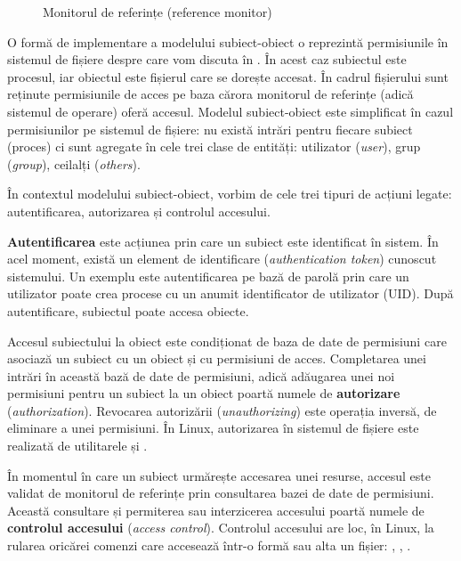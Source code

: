 \begin{figure}[htbp]
  \centering
  \def\svgwidth{\columnwidth}
  
  \caption{Monitorul de referințe (reference monitor)}
  \label{fig:sec:reference-monitor}
\end{figure}

O formă de implementare a modelului subiect-obiect o reprezintă permisiunile în sistemul de fișiere despre care vom discuta în . În acest caz subiectul este procesul, iar obiectul este fișierul care se dorește accesat. În cadrul fișierului sunt reținute permisiunile de acces pe baza cărora monitorul de referințe (adică sistemul de operare) oferă accesul. Modelul subiect-obiect este simplificat în cazul permisiunilor pe sistemul de fișiere: nu există intrări pentru fiecare subiect (proces) ci sunt agregate în cele trei clase de entități: utilizator (\textit{user}), grup (\textit{group}), ceilalți (\textit{others}).

În contextul modelului subiect-obiect, vorbim de cele trei tipuri de acțiuni legate: autentificarea, autorizarea și controlul accesului.

\textbf{Autentificarea} este acțiunea prin care un subiect este identificat în sistem. În acel moment, există un element de identificare (\textit{authentication token}) cunoscut sistemului. Un exemplu este autentificarea pe bază de parolă prin care un utilizator poate crea procese cu un anumit identificator de utilizator (UID). După autentificare, subiectul poate accesa obiecte.

Accesul subiectului la obiect este condiționat de baza de date de permisiuni care asociază un subiect cu un obiect și cu permisiuni de acces. Completarea unei intrări în această bază de date de permisiuni, adică adăugarea unei noi permisiuni pentru un subiect la un obiect poartă numele de \textbf{autorizare} (\textit{authorization}). Revocarea autorizării (\textit{unauthorizing}) este operația inversă, de eliminare a unei permisiuni. În Linux, autorizarea în sistemul de fișiere este realizată de utilitarele  și .

În momentul în care un subiect urmărește accesarea unei resurse, accesul este validat de monitorul de referințe prin consultarea bazei de date de permisiuni. Această consultare și permiterea sau interzicerea accesului poartă numele de \textbf{controlul accesului} (\textit{access control}). Controlul accesului are loc, în Linux, la rularea oricărei comenzi care accesează într-o formă sau alta un fișier: , , .

